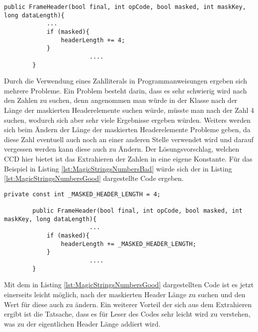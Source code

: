 \begin{lstlisting}[language={[Sharp]C}, caption=MagicNumbers, label=lst:MagicStringsNumbersBad]
        public FrameHeader(bool final, int opCode, bool masked, int maskKey, long dataLength){
           	...
            if (masked){
                headerLength += 4;
            }
						....
        }
\end{lstlisting}

\SuperPar Durch die Verwendung eines Zahlliterals in Programmanweisungen ergeben sich mehrere Probleme. Ein Problem besteht darin, dass es sehr schwierig wird nach den Zahlen zu suchen, denn angenommen man würde in der Klasse nach der Länge der maskierten Headerelemente suchen würde, müsste man nach der Zahl 4 suchen, wodurch sich aber sehr viele Ergebnisse ergeben würden. Weiters werden sich beim Ändern der Länge der maskierten Headerelemente Probleme geben, da diese Zahl eventuell auch noch an einer anderen Stelle verwendet wird und darauf vergessen werden kann diese auch zu Ändern. Der Lösungsvorschlag, welchen CCD hier bietet ist das Extrahieren der Zahlen in eine eigene Konstante. Für das Beispiel in Listing \ref{lst:MagicStringsNumbersBad}  würde sich der in Listing \ref{lst:MagicStringsNumbersGood} dargestellte Code ergeben.

\begin{lstlisting}[language={[Sharp]C}, caption=Magic number, label=lst:MagicStringsNumbersGood]
				private const int _MASKED_HEADER_LENGTH = 4;
	
        public FrameHeader(bool final, int opCode, bool masked, int maskKey, long dataLength){
						...
            if (masked){
                headerLength += _MASKED_HEADER_LENGTH;
            }
						....
        }
\end{lstlisting}

\SuperPar Mit dem in Listing \ref{lst:MagicStringsNumbersGood} dargestellten Code ist es jetzt einerseits leicht möglich, nach der maskierten Header Länge zu suchen und den Wert für diese auch zu ändern. Ein weiterer Vorteil der sich aus dem Extrahieren ergibt ist die Tatsache, dass es für Leser des Codes sehr leicht wird zu verstehen, was zu der eigentlichen Header Länge addiert wird. 



